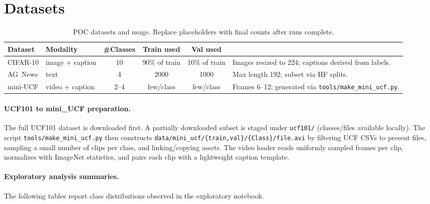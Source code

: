 \documentclass[11pt,a4paper]{article}
\newcommand{\CIFAR}{CIFAR-10}
\newcommand{\AGNEWS}{AG~News}
\newcommand{\MINIUCF}{mini-UCF}
\begin{document}
\section{Datasets}
\begin{table}[H]
\centering
\caption{POC datasets and usage. Replace placeholders with final counts after runs complete.}
\begin{tabularx}{\linewidth}{@{}l l c c c X@{}}
\toprule
Dataset & Modality & \#Classes & Train used & Val used \\
\midrule
\CIFAR{} & image + caption & 10 & 90\% of train & 10\% of train & Images resized to 224; captions derived from labels. \\
\AGNEWS{} & text & 4 & 2000 & 1000 & Max length 192; subset via HF splits. \\
\MINIUCF{} & video + caption & 2--4 & few/class & few/class & Frames 6--12; generated via \texttt{tools/make\_mini\_ucf.py}. \\
\bottomrule
\end{tabularx}
\end{table}

\paragraph{UCF101 to mini\_UCF preparation.}
The full UCF101 dataset is downloaded first. A partially downloaded subset is staged under \texttt{ucf101/} (classes/files available locally). The script \texttt{tools/make\_mini\_ucf.py} then constructs \texttt{data/mini\_ucf/\{train,val\}/\{Class\}/file.avi} by filtering UCF CSVs to present files, sampling a small number of clips per class, and linking/copying assets. The video loader reads uniformly sampled frames per clip, normalizes with ImageNet statistics, and pairs each clip with a lightweight caption template.

\paragraph{Exploratory analysis summaries.}
The following tables report class distributions observed in the exploratory notebook.
\end{document}
